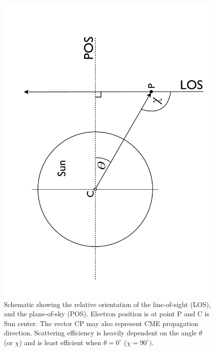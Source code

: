 \begin{figure}[t!]
\begin{center}
\includegraphics[trim = 0cm 0cm 0cm 0cm, scale=0.4, angle=270]{images/LOS_POS_2.pdf}
\caption[Line-of-sight and plane-of-sky orientations]{Schematic showing the relative orientation of the line-of-sight (LOS), and the plane-of-sky (POS). Electron position is at point P and C is Sun center. The vector CP may also represent CME propagation direction. Scattering efficiency is heavily dependent on the angle $\theta$ 
(or $\chi$) and is least efficient 
when $\theta = 0^{\circ}$ ($\chi=90^{\circ})$.}
\label{fig:LOS_POS_2}
\end{center}
\end{figure}
 
